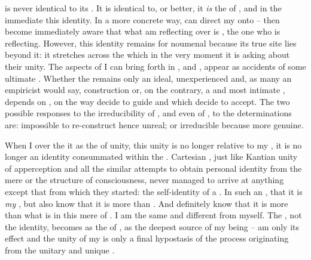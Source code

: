 \pa\label{pa:usedBuber}  is never identical to its .
It is identical to, or better, it {\em is} the  of , and
in the immediate    this identity.  In a
more concrete way,  can direct my  onto  -- then
 become immediately aware that what  am reflecting over is ,
the one who is reflecting.  However, this identity remains for
 noumenal because its true site lies beyond it: it stretches
across the  which  in the very moment
it is asking about their unity.  The aspects of  I can bring forth in
,  and ,
appear as accidents of some ultimate .  Whether the  remains
only an ideal, unexperienced and, as many an empiricist would say, 
construction or, on the contrary, a  and most intimate
, depends on , on the way  decide to guide  and which   decide to accept. The two possible
responses to the  irreducibility of , and even of
, to the  determinations are: impossible to
re-construct hence unreal; or irreducible because more genuine.

When I  over the   it as the
 of  unity, this unity is no longer relative to my
, it is no longer an  identity consummated within
the \hoa.  Cartesian , just like Kantian unity of apperception and
all the similar attempts to obtain personal identity from the mere  or
the structure of  consciousness, never managed to arrive at anything
except that from which they started: the  self-identity of a
.  In such an ,   that it
is {\em my} , but  also know that it is more than .
And  definitely know that it is more than what is  in this
mere  of .  I am the same and different from myself.
The , not the identity, becomes  as the  of
, as the deepest source of my being --  am only its
 effect and the unity of my  is only a final hypostasis of
the  process originating from the unitary and unique .

